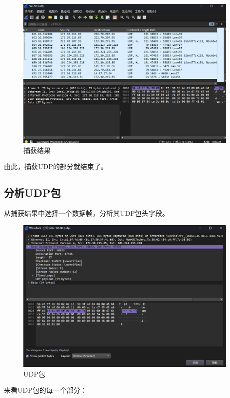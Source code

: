 \documentclass{article}
\begin{document}
	\begin{figure}[H]
		\centering
		\includegraphics[width=11cm]{images/3.捕获结果.png}
		\caption{捕获结果}
	\end{figure}
	
	由此，捕获UDP的部分就结束了。
	
	\subsection{分析UDP包}
	
	从捕获结果中选择一个数据帧，分析其UDP包头字段。
	
	\begin{figure}[H]
		\centering
		\includegraphics[width=11cm]{images/4.UDP包.png}
		\caption{UDP包}
	\end{figure}
	
	来看UDP包的每一个部分：
	
\end{document}
